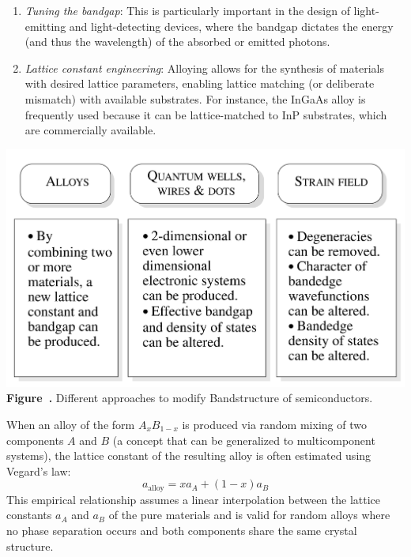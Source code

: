 \begin{enumerate}
	\item \textit{Tuning the bandgap}: This is particularly important in the design of light-emitting and light-detecting devices, where the bandgap dictates the energy (and thus the wavelength) of the absorbed or emitted photons.
	\item \textit{Lattice constant engineering}: Alloying allows for the synthesis of materials with desired lattice parameters, enabling lattice matching (or deliberate mismatch) with available substrates. For instance, the InGaAs alloy is frequently used because it can be lattice-matched to InP substrates, which are commercially available.
\end{enumerate}
\begin{center}
	\begin{minipage}{0.7\textwidth}
		\centering
		\includegraphics[width=\textwidth]{img/Approaches_BandStructureMod.png}
		\\[0.5em]
		\textbf{Figure~\thefigure.} Different approaches to modify Bandstructure of semiconductors.
		\label{fig:Approaches_BandStructureMod}
	\end{minipage}
\end{center}
When an alloy of the form \( A_{x}B_{1-x} \) is produced via random mixing of two components \( A \) and \( B \) (a concept that can be generalized to multicomponent systems), the lattice constant of the resulting alloy is often estimated using Vegard's law:
\[
	a_{\text{alloy}} = x a_A + (1 - x) a_B
\]
This empirical relationship assumes a linear interpolation between the lattice constants \( a_A \) and \( a_B \) of the pure materials and is valid for random alloys where no phase separation occurs and both components share the same crystal structure.
